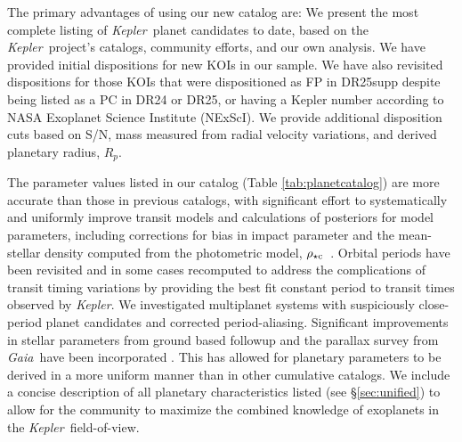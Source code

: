 \documentclass{aastex62}
\newcommand{\ikt}{{\it Kepler}}
\newcommand{\ik}{{\it Kepler~}}
\newcommand{\gaia}{{\it Gaia~}}
\newcommand{\rhoc}{\ensuremath{\rho_{\star {\rm c}}}}
\begin{document}
{The primary advantages of using our new catalog are: We present the most complete listing of \ik planet candidates to date, based on the \ik project's catalogs, community efforts, and our own analysis. We have provided initial dispositions for new KOIs in our sample. We have also revisited dispositions for those KOIs that were dispositioned as FP in DR25supp despite being listed as a PC in DR24 or DR25, or having a Kepler number according to NASA Exoplanet Science Institute (NExScI).   We provide additional disposition cuts based on S/N, mass measured from radial velocity variations, and derived planetary radius, $R_p$. 

The  parameter values listed in our catalog (Table \ref{tab:planetcatalog}) are more accurate than those in previous catalogs, with significant effort to systematically and uniformly improve transit models and calculations of posteriors for model parameters, including corrections for bias in impact parameter and the mean-stellar density computed from the photometric model, \rhoc~\citep{Gilbert:2022}.  Orbital periods have been revisited and in some cases recomputed to address the complications of transit timing variations by providing the best fit constant period to transit times observed by \ikt.  We investigated multiplanet systems with suspiciously close-period planet candidates and corrected period-aliasing.   Significant improvements in stellar parameters from ground based followup and the parallax survey from \gaia have been incorporated \citep{Fulton:2018,Berger:2020a}.  This has allowed for planetary parameters to be derived in a more uniform manner than in other cumulative catalogs.  We include a concise description of all planetary characteristics listed (see \S\ref{sec:unified}) to allow for the community to maximize the combined knowledge of exoplanets in the \ik field-of-view.
}   
 



\end{document}
